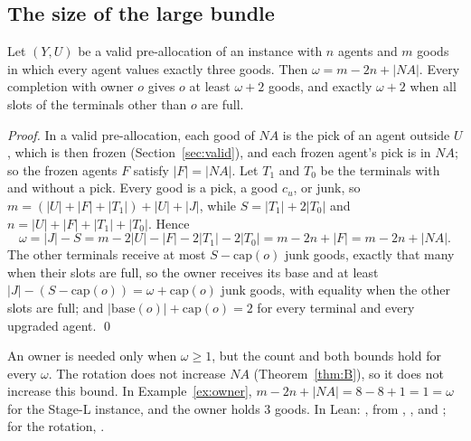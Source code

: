 \documentclass[runningheads,11pt]{llncs}
\newcommand{\NA}{\mathit{NA}}
\newcommand{\capa}{\mathrm{cap}}
\newcommand{\base}{\mathrm{base}}
\begin{document}
\subsection{The size of the large bundle}\label{sec:size}

\begin{proposition}\label{prop:size}
Let $(Y,U)$ be a valid pre-allocation of an instance with $n$ agents and $m$ goods in which every agent values exactly three goods. Then $\omega=m-2n+|\NA|$. Every completion with owner $o$ gives $o$ at least $\omega+2$ goods, and exactly $\omega+2$ when all slots of the terminals other than $o$ are full.
\end{proposition}

\begin{proof}
In a valid pre-allocation, each good of $\NA$ is the pick of an agent outside $U$, which is then frozen (Section~\ref{sec:valid}), and each frozen agent's pick is in $\NA$; so the frozen agents $F$ satisfy $|F|=|\NA|$. Let $T_1$ and $T_0$ be the terminals with and without a pick. Every good is a pick, a good $c_u$, or junk, so $m=(|U|+|F|+|T_1|)+|U|+|J|$, while $S=|T_1|+2|T_0|$ and $n=|U|+|F|+|T_1|+|T_0|$. Hence
\[
  \omega=|J|-S=m-2|U|-|F|-2|T_1|-2|T_0|=m-2n+|F|=m-2n+|\NA|.
\]
The other terminals receive at most $S-\capa(o)$ junk goods, exactly that many when their slots are full, so the owner receives its base and at least $|J|-(S-\capa(o))=\omega+\capa(o)$ junk goods, with equality when the other slots are full; and $|\base(o)|+\capa(o)=2$ for every terminal and every upgraded agent. \qed
\end{proof}

\noindent An owner is needed only when $\omega\ge1$, but the count and both bounds hold for every $\omega$. The rotation does not increase $\NA$ (Theorem~\ref{thm:B}), so it does not increase this bound. In Example~\ref{ex:owner}, $m-2n+|\NA|=8-8+1=1=\omega$ for the Stage-L instance, and the owner holds $3$ goods. In Lean: , from , ,  and ; for the rotation, .
\end{document}
